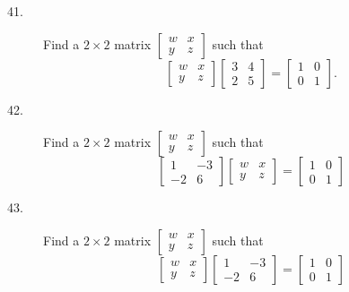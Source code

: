\documentclass{article}
\begin{document}
\begin{description}
  \item[41.] Find a $2 \times 2$ matrix $\begin{bmatrix} w & x \\ y & z \end{bmatrix}$ such that
    \begin{equation*}
    \begin{bmatrix} w & x \\ y & z \end{bmatrix} \begin{bmatrix} 3 & 4 \\ 2 & 5 \end{bmatrix} 
    = \begin{bmatrix} 1 & 0 \\ 0 & 1 \end{bmatrix}.
    \end{equation*}

  \item[42.] Find a $2 \times 2$ matrix $\begin{bmatrix} w & x \\ y & z \end{bmatrix}$ such that
    \begin{equation*}
    \begin{bmatrix} 1 & -3 \\ -2 & 6 \end{bmatrix} \begin{bmatrix} w & x \\ y & z \end{bmatrix} 
    = \begin{bmatrix} 1 & 0 \\ 0 & 1 \end{bmatrix}
    \end{equation*}

  \item[43.] Find a $2 \times 2$ matrix $\begin{bmatrix} w & x \\ y & z \end{bmatrix}$ such that
    \begin{equation*}
    \begin{bmatrix} w & x \\ y & z \end{bmatrix} \begin{bmatrix} 1&-3\\ -2&6 \end{bmatrix} 
    = \begin{bmatrix} 1 & 0 \\ 0 & 1 \end{bmatrix}
    \end{equation*}


\end{description}
\end{document}
